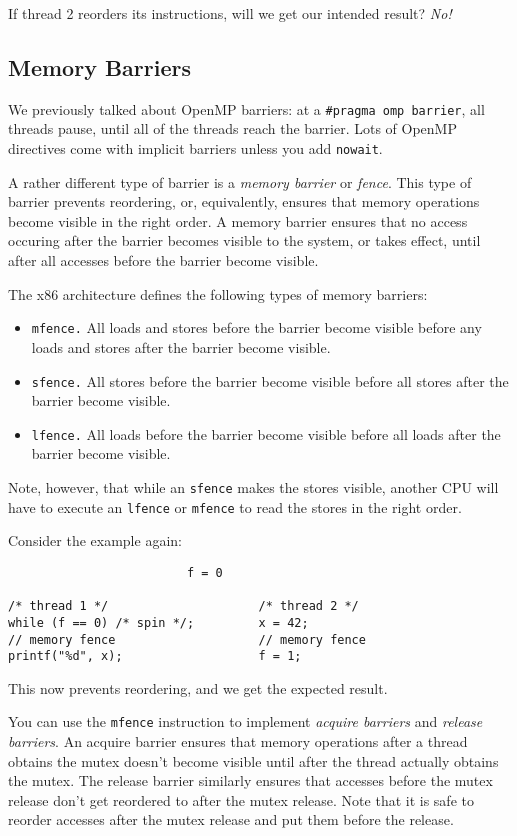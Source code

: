 \documentclass[11pt]{article}
\begin{document}
If thread 2 reorders its instructions, will we get our intended
result? \emph{No!}

\subsection*{Memory Barriers} We previously talked about OpenMP barriers: 
at a {\tt \#pragma omp barrier}, all threads pause, until all of the
threads reach the barrier. Lots of OpenMP directives come with implicit barriers
unless you add {\tt nowait}.

A rather different type of barrier is a \emph{memory barrier} or
\emph{fence}. This type of barrier prevents reordering, or,
equivalently, ensures that memory operations become visible in the
right order. A memory barrier ensures that no access occuring after
the barrier becomes visible to the system, or takes effect, until
after all accesses before the barrier become visible.

\newpage
The x86 architecture defines the following types of memory 
barriers:

\begin{itemize}
\item {\tt mfence.} All loads and stores before the barrier become
visible before any loads and stores after the barrier become visible.
\item {\tt sfence.} All stores before the barrier become visible before
all stores after the barrier become visible.
\item {\tt lfence.} All loads before the barrier become visible before
all loads after the barrier become visible.
\end{itemize}

Note, however, that while an {\tt sfence} makes the stores visible,
another CPU will have to execute an {\tt lfence} or {\tt mfence} to
read the stores in the right order.

Consider the example again:
  \begin{lstlisting}
                         f = 0

/* thread 1 */                     /* thread 2 */
while (f == 0) /* spin */;         x = 42;
// memory fence                    // memory fence
printf("%d", x);                   f = 1;
  \end{lstlisting}
This now prevents reordering, and we get the expected result.

You can use the {\tt mfence} instruction to implement \emph{acquire
  barriers} and \emph{release barriers}.  An acquire barrier ensures
that memory operations after a thread obtains the mutex doesn't become
visible until after the thread actually obtains the mutex.
The release barrier similarly ensures that accesses before the mutex
release don't get reordered to after the mutex release. Note that
it is safe to reorder accesses after the mutex release and put them
before the release.
\end{document}
